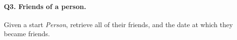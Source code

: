 \paragraph{\textbf{Q3}. Friends of a person.}
Given a start \emph{Person}, retrieve all of their friends, and the date
at which they became friends.

